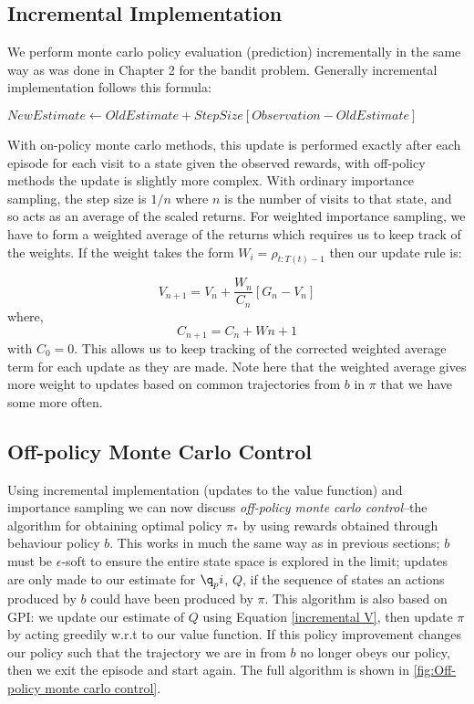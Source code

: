 \subsection{Incremental Implementation}
We perform monte carlo policy evaluation (prediction) incrementally in the same way as was done in Chapter 2 for the bandit problem. Generally incremental implementation follows this formula:

$
New Estimate \leftarrow Old Estimate + Step Size \left[Observation - Old Estimate \right]
$

With on-policy monte carlo methods, this update is performed exactly after each episode for each visit to a state given the observed rewards, with off-policy methods the update is slightly more complex. With ordinary importance sampling, the step size is $1/n$ where $n$ is the number of visits to that state, and so acts as an average of the scaled returns. For weighted importance sampling, we have to form a weighted average of the returns which requires us to keep track of the weights. If the weight takes the form $W_i = \rho_{t:T(t)-1}$ then our update rule is:

\begin{equation} \label{incremental V}
V_{n+1} = V_n + \frac{W_n}{C_n}\left[G_n - V_n\right]
\end{equation}
where,
\begin{equation}
C_{n+1} = C_n + W{n+1}
\end{equation}
with $C_0 = 0$. This allows us to keep tracking of the corrected weighted average term for each update as they are made. Note here that the weighted average gives more weight to updates based on common trajectories from $b$ in $\pi$ that we have some more often.

\subsection{Off-policy Monte Carlo Control}
Using incremental implementation (updates to the value function) and importance sampling we can now discuss \textit{off-policy monte carlo control}–the algorithm for obtaining optimal policy $\pi_*$ by using rewards obtained through behaviour policy $b$. This works in much the same way as in previous sections; $b$ must be $\epsilon$-soft to ensure the entire state space is explored in the limit; updates are only made to our estimate for $\q_pi$, $Q$, if the sequence of states an actions produced by $b$ could have been produced by $\pi$. This algorithm is also based on GPI: we update our estimate of $Q$ using Equation \ref*{incremental V}, then update $\pi$ by acting greedily w.r.t to our value function. If this policy improvement changes our policy such that the trajectory we are in from $b$ no longer obeys our policy, then we exit the episode and start again. The full algorithm is shown in \ref*{fig:Off-policy monte carlo control}.

